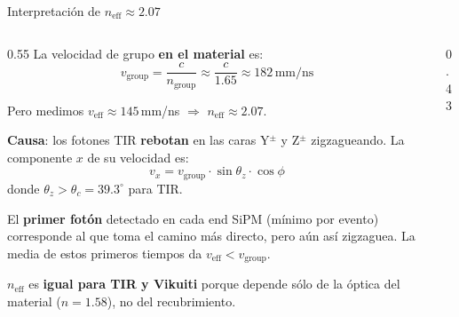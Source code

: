 \documentclass[aspectratio=169,10pt]{beamer}
\begin{document}
\begin{frame}{Interpretación de $n_\text{eff} \approx 2.07$}

\begin{columns}[T]
  \begin{column}{0.55\textwidth}
  \footnotesize
  La velocidad de grupo \textbf{en el material} es:
  \[ v_\text{group} = \frac{c}{n_\text{group}} \approx \frac{c}{1.65} \approx 182\,\text{mm/ns} \]

  Pero medimos $v_\text{eff} \approx 145$\,mm/ns $\Rightarrow$ $n_\text{eff} \approx 2.07$.

  \vspace{0.5em}
  \textbf{Causa}: los fotones TIR \textbf{rebotan} en las caras Y$^\pm$
  y Z$^\pm$ zigzagueando. La componente $x$ de su velocidad es:
  \[ v_x = v_\text{group} \cdot \sin\theta_z \cdot \cos\phi \]
  donde $\theta_z > \theta_c = 39.3^\circ$ para TIR.

  \vspace{0.5em}
  El \textbf{primer fotón} detectado en cada end SiPM (mínimo
  por evento) corresponde al que toma el camino más directo,
  pero aún así zigzaguea. La media de estos primeros tiempos
  da $v_\text{eff} < v_\text{group}$.

  \vspace{0.4em}
  $n_\text{eff}$ es \textbf{igual para TIR y Vikuiti} porque
  depende sólo de la óptica del material ($n=1.58$), no del recubrimiento.
  \end{column}

  \begin{column}{0.43\textwidth}
\end{column}
\end{columns}
\end{frame}
\end{document}
